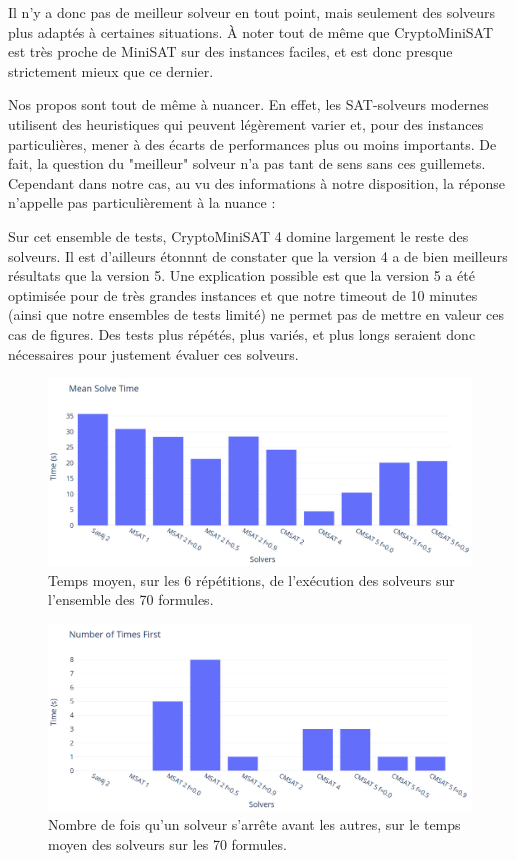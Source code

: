 \documentclass[11pt,a4paper]{article}
\begin{document}
Il n'y a donc pas de meilleur solveur en tout point, mais seulement des solveurs plus adaptés à certaines situations. À noter tout de même que CryptoMiniSAT est très proche de MiniSAT sur des instances faciles, et est donc presque strictement mieux que ce dernier.

Nos propos sont tout de même à nuancer.
En effet, les SAT-solveurs modernes utilisent des heuristiques qui peuvent légèrement varier et, pour des instances particulières, mener à des écarts de performances plus ou moins importants. De fait, la question du "meilleur" solveur n'a pas tant de sens sans ces guillemets. Cependant dans notre cas, au vu des informations à notre disposition, la réponse n'appelle pas particulièrement à la nuance :

Sur cet ensemble de tests, CryptoMiniSAT 4 domine largement le reste des solveurs.
Il est d'ailleurs étonnnt de constater que la version 4 a de bien meilleurs résultats que la version 5. Une explication possible est que la version 5 a été optimisée pour de très grandes instances et que notre timeout de 10 minutes (ainsi que notre ensembles de tests limité) ne permet pas de mettre en valeur ces cas de figures. Des tests plus répétés, plus variés, et plus longs seraient donc nécessaires pour justement évaluer ces solveurs.

\begin{figure}
  \includegraphics[width=0.6\linewidth]{plot-mean.png}
  \caption{Temps moyen, sur les 6 répétitions, de l'exécution des solveurs sur l'ensemble des 70 formules. }
  \label{fig:mean}
\end{figure}

\begin{figure}
  \includegraphics[width=0.6\linewidth]{plot-first.png}
  \caption{Nombre de fois qu'un solveur s'arrête avant les autres, sur le temps moyen des solveurs sur les 70 formules.}
  \label{fig:first}
\end{figure}
\end{document}

